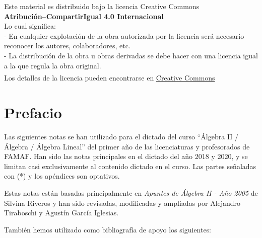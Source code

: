 \documentclass[a4paper,12pt,twoside,spanish,reqno,dottedtoc]{scrbook}
\begin{document}
	${}^{}$\\
	{\flushleft 
		Este material es distribuido bajo la licencia Creative Commons} \\
		\center  	\textbf{Atribución--CompartirIgual 4.0 Internacional}
	\\ 
	\center  Lo cual significa: 
	\\
	\flushleft
	- En cualquier explotación de la obra autorizada por la licencia será necesario reconocer los autores, colaboradores, etc.\\
	- La distribución de la obra u obras derivadas se debe hacer con una licencia igual a la que regula la obra original.\\
	${}^{}$
	\\
	Los detalles de la licencia pueden encontrarse en \href{https://creativecommons.org/licenses/by/4.0/deed.es}{Creative Commons}
	\vskip 1cm 
	\endgroup

	
	
	 
	\pagestyle{scrheadings} %
	\cleardoublepage %
	\cleardoublepage
	

	
	\chapter*{Prefacio} 
	
	
	Las siguientes notas se han utilizado para el dictado del curso ``Álgebra II / Álgebra / Álgebra Lineal'' del primer año de las licenciaturas y profesorados de FAMAF. 	Han sido las notas principales en el dictado del año 2018 y 2020, y se limitan casi exclusivamente al contenido dictado en el curso. Las partes señaladas con (*) y los apéndices son optativos.
	
	Estas notas están basadas principalmente en \textit{Apuntes de Álgebra II - Año 2005} de Silvina Riveros y han sido revisadas, modificadas y ampliadas por Alejandro Tiraboschi  y Agustín García Iglesias. 
	
	También hemos utilizado como bibliografía de apoyo  los siguientes: 
	
\end{document}
